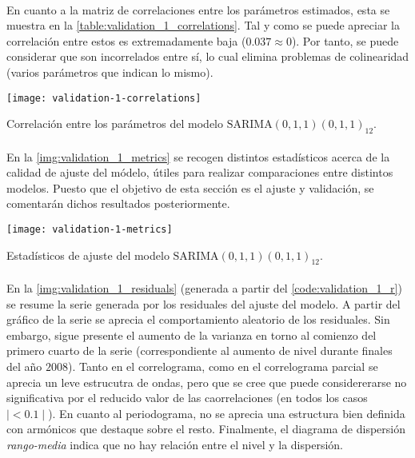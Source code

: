 \documentclass[a4paper, spanish]{article}
\begin{document}
      \paragraph{}
      En cuanto a la matriz de correlaciones entre los parámetros estimados, esta se muestra en la \autoref{table:validation_1_correlations}. Tal y como se puede apreciar la correlación entre estos es extremadamente baja ($0.037 \approx 0$). Por tanto, se puede considerar que son incorrelados entre sí, lo cual elimina problemas de colinearidad (varios parámetros que indican lo mismo).

      \begin{table}[htb!]
        \centering
        \texttt{[image: validation-1-correlations]}
        \caption{Correlación entre los parámetros del modelo $\text{SARIMA}(0, 1, 1)(0, 1, 1)_{12}$.}
        \label{table:validation_1_correlations}
      \end{table}

      \paragraph{}
      En la \autoref{img:validation_1_metrics} se recogen distintos estadísticos acerca de la calidad de ajuste del módelo, útiles para realizar comparaciones entre distintos modelos. Puesto que el objetivo de esta sección es el ajuste y validación, se comentarán dichos resultados posteriormente.

      \begin{table}[htb!]
        \centering
        \texttt{[image: validation-1-metrics]}
        \caption{Estadísticos de ajuste del modelo $\text{SARIMA}(0, 1, 1)(0, 1, 1)_{12}$.}
        \label{img:validation_1_metrics}
      \end{table}

      \paragraph{}
      En la \autoref{img:validation_1_residuals} (generada a partir del \autoref{code:validation_1_r}) se resume la serie generada por los residuales del ajuste del modelo. A partir del gráfico de la serie se aprecia el comportamiento aleatorio de los residuales. Sin embargo, sigue presente el aumento de la varianza en torno al comienzo del primero cuarto de la serie (correspondiente al aumento de nivel durante finales del año $2008$). Tanto en el correlograma, como en el correlograma parcial se aprecia un leve estrucutra de ondas, pero que se cree que puede considererarse no significativa por el reducido valor de las caorrelaciones (en todos los casos $\mid < 0.1 \mid$). En cuanto al periodograma, no se aprecia una estructura bien definida con armónicos que destaque sobre el resto. Finalmente, el diagrama de dispersión \emph{rango-media} indica que no hay relación entre el nivel y la dispersión.
\end{document}
